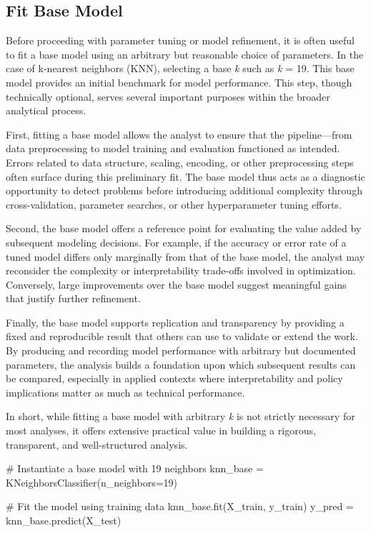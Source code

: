 \documentclass[
]{article}
\newenvironment{Shaded}{\begin{snugshade}}{\end{snugshade}}
\newcommand{\CommentTok}[1]{\textcolor[rgb]{0.37,0.37,0.37}{#1}}
\newcommand{\DecValTok}[1]{\textcolor[rgb]{0.68,0.00,0.00}{#1}}
\newcommand{\NormalTok}[1]{\textcolor[rgb]{0.00,0.23,0.31}{#1}}
\newcommand{\OperatorTok}[1]{\textcolor[rgb]{0.37,0.37,0.37}{#1}}
\begin{document}
\subsection{Fit Base Model}\label{fit-base-model}

Before proceeding with parameter tuning or model refinement, it is often
useful to fit a base model using an arbitrary but reasonable choice of
parameters. In the case of k-nearest neighbors (KNN), selecting a base
\emph{k} such as \emph{k} = 19. This base model provides an initial
benchmark for model performance. This step, though technically optional,
serves several important purposes within the broader analytical process.

First, fitting a base model allows the analyst to ensure that the
pipeline---from data preprocessing to model training and evaluation
functioned as intended. Errors related to data structure, scaling,
encoding, or other preprocessing steps often surface during this
preliminary fit. The base model thus acts as a diagnostic opportunity to
detect problems before introducing additional complexity through
cross-validation, parameter searches, or other hyperparameter tuning
efforts.

Second, the base model offers a reference point for evaluating the value
added by subsequent modeling decisions. For example, if the accuracy or
error rate of a tuned model differs only marginally from that of the
base model, the analyst may reconsider the complexity or
interpretability trade-offs involved in optimization. Conversely, large
improvements over the base model suggest meaningful gains that justify
further refinement.

Finally, the base model supports replication and transparency by
providing a fixed and reproducible result that others can use to
validate or extend the work. By producing and recording model
performance with arbitrary but documented parameters, the analysis
builds a foundation upon which subsequent results can be compared,
especially in applied contexts where interpretability and policy
implications matter as much as technical performance.

In short, while fitting a base model with arbitrary \emph{k} is not
strictly necessary for most analyses, it offers extensive practical
value in building a rigorous, transparent, and well-structured analysis.

\begin{Shaded}
\begin{Highlighting}[]
\CommentTok{\# Instantiate a base model with 19 neighbors}
\NormalTok{knn\_base }\OperatorTok{=}\NormalTok{ KNeighborsClassifier(n\_neighbors}\OperatorTok{=}\DecValTok{19}\NormalTok{)}

\CommentTok{\# Fit the model using training data}
\NormalTok{knn\_base.fit(X\_train, y\_train)}
\NormalTok{y\_pred }\OperatorTok{=}\NormalTok{ knn\_base.predict(X\_test)}
\end{Highlighting}
\end{Shaded}
\end{document}
